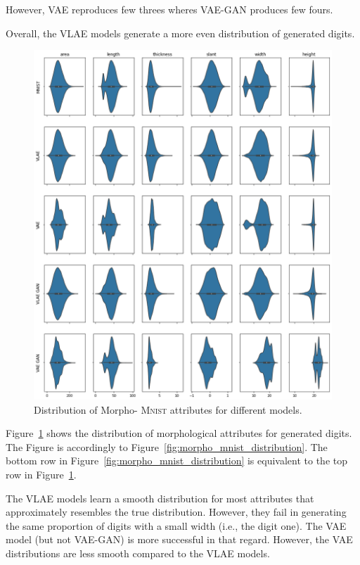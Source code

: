 However, \ac{VAE} reproduces few threes wheres \ac{VAE}-\ac{GAN} produces few fours.

Overall, the \ac{VLAE} models generate a more even distribution of generated digits.

\begin{figure}
    \centering
    \includegraphics[width=\textwidth]{images/generated_vs_true/morpho_distr.png}
    \caption{Distribution of Morpho- \textsc{Mnist} attributes for different models.}
    \label{fig:generated_morpho_distribution}
\end{figure}

Figure~\ref{fig:generated_morpho_distribution} shows the distribution of morphological attributes for generated digits.
The Figure is accordingly to Figure~\ref{fig:morpho_mnist_distribution}.
The bottom row in Figure~\ref{fig:morpho_mnist_distribution} is equivalent to the top row in Figure~\ref{fig:generated_morpho_distribution}.

The \ac{VLAE} models learn a smooth distribution for most attributes that approximately resembles the true distribution.
However, they fail in generating the same proportion of digits with a small width (i.e., the digit one).
The \ac{VAE} model (but not \ac{VAE}-\ac{GAN}) is more successful in that regard.
However, the \ac{VAE} distributions are less smooth compared to the \ac{VLAE} models.

